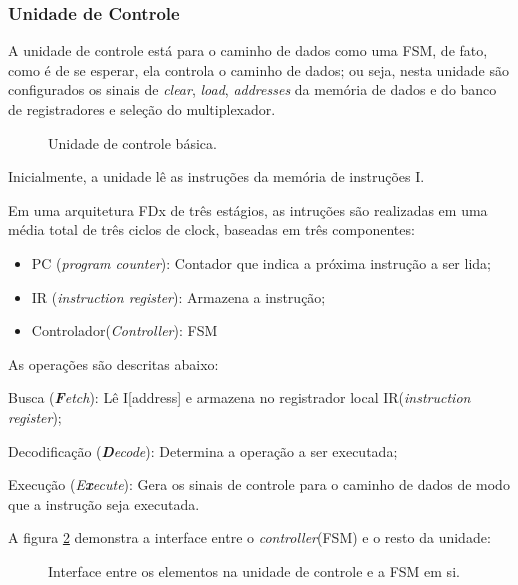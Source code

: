 \documentclass{article}
\begin{document}
\newpage
\subsubsection{Unidade de Controle}
A unidade de controle está para o caminho de dados como uma FSM, de fato, como é de se esperar, ela controla o caminho de dados; ou seja, nesta unidade são configurados os sinais de \textit{clear}, \textit{load}, \textit{addresses} da memória de dados e do banco de registradores e seleção do multiplexador.

\begin{figure}[h!]
     \centering
     \def\svgwidth{0.4\textwidth}
     
     \caption{\label{fig:fdx} Unidade de controle básica. }
     \hfill
\end{figure}

Inicialmente, a unidade lê as instruções da memória de instruções I.

Em uma arquitetura FDx de três estágios, as intruções são realizadas em uma média total de três ciclos de clock, baseadas em três componentes: 
\begin{itemize}
     \item PC (\textit{program counter}): Contador que indica a próxima instrução a ser lida;
     \item IR (\textit{instruction register}): Armazena a instrução;
     \item Controlador(\textit{Controller}): FSM
\end{itemize}
As operações são descritas abaixo:

\begin{boxlabel}
     \item Busca (\textit{\textbf{F}etch}): Lê I[address] e armazena no registrador local IR(\textit{instruction register});
     \item Decodificação (\textit{\textbf{D}ecode}): Determina a operação a ser executada;
     \item Execução (\textit{E\textbf{x}ecute}): Gera os sinais de controle para o caminho de dados de modo que a instrução seja executada.
\end{boxlabel}

A figura \ref{fig:fdx2} demonstra a interface entre o \textit{controller}(FSM) e o resto da unidade:

\newpage
\begin{figure}[h!]
     \centering
     \def\svgwidth{0.7\textwidth}
     
     \caption{\label{fig:fdx2} Interface entre os elementos na unidade de controle e a FSM em si.}
     \hfill
\end{figure}
\end{document}
